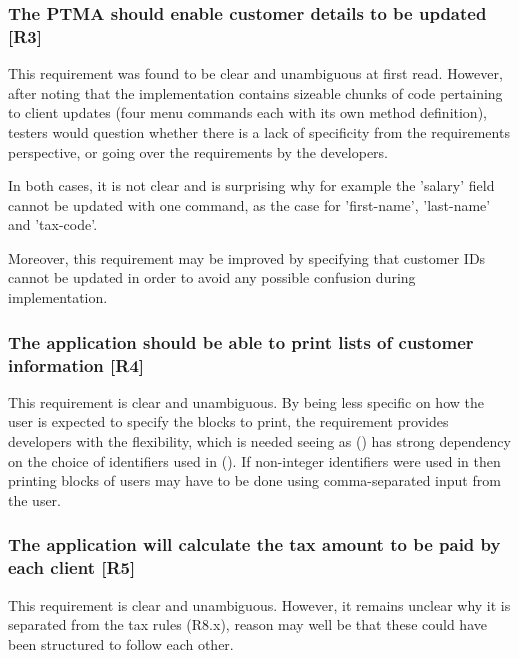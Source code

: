 \subsubsection{The PTMA should enable customer details to be updated [R3]}
This requirement was found to be clear and unambiguous at first read. 
However, after noting that the implementation contains sizeable chunks of code pertaining to client updates (four menu commands each with its own method definition), testers would question whether there is a lack of specificity from the requirements perspective, or going over the requirements by the developers. 
\par
In both cases, it is not clear and is surprising why for example the 'salary' field cannot be updated with one command, as the case for 'first-name', 'last-name' and 'tax-code'.  
\par
Moreover, this requirement may be improved by specifying that customer IDs cannot be updated in order to avoid any possible confusion during implementation. 

\subsubsection{The application should be able to print lists of customer information [R4]}
This requirement is clear and unambiguous. 
By being less specific on how the user is expected to specify the blocks to print, the requirement provides developers with the flexibility, which is needed seeing as (\RFour) has strong dependency on the choice of identifiers used in (\RTwo). If non-integer identifiers were used in \RTwo \space then printing blocks of users may have to be done using comma-separated input from the user. 

\subsubsection{The application will calculate the tax amount to be paid by each client [R5]} 
This requirement is clear and unambiguous. 
However, it remains unclear why it is separated from the tax rules (R8.x), reason may well be that these could have been structured to follow each other. 

